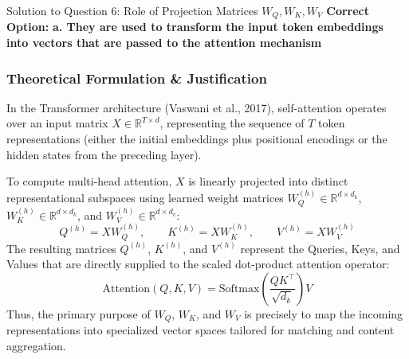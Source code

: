 \documentclass[11pt,a4paper]{article}
\begin{document}
\begin{solutionbox}{Solution to Question 6: Role of Projection Matrices $W_Q, W_K, W_V$}
\textbf{Correct Option:} \textbf{a. They are used to transform the input token embeddings into vectors that are passed to the attention mechanism}

\subsubsection*{Theoretical Formulation \& Justification}
In the Transformer architecture (Vaswani et al., 2017), self-attention operates over an input matrix $X \in \mathbb{R}^{T \times d}$, representing the sequence of $T$ token representations (either the initial embeddings plus positional encodings or the hidden states from the preceding layer).

To compute multi-head attention, $X$ is linearly projected into distinct representational subspaces using learned weight matrices $W_Q^{(h)} \in \mathbb{R}^{d \times d_k}$, $W_K^{(h)} \in \mathbb{R}^{d \times d_k}$, and $W_V^{(h)} \in \mathbb{R}^{d \times d_v}$:
\begin{equation*}
Q^{(h)} = X W_Q^{(h)}, \qquad K^{(h)} = X W_K^{(h)}, \qquad V^{(h)} = X W_V^{(h)}
\end{equation*}
The resulting matrices $Q^{(h)}$, $K^{(h)}$, and $V^{(h)}$ represent the Queries, Keys, and Values that are directly supplied to the scaled dot-product attention operator:
\begin{equation*}
\text{Attention}(Q, K, V) = \text{Softmax}\left( \frac{Q K^\top}{\sqrt{d_k}} \right) V
\end{equation*}
Thus, the primary purpose of $W_Q$, $W_K$, and $W_V$ is precisely to map the incoming representations into specialized vector spaces tailored for matching and content aggregation.


\end{solutionbox}
\end{document}
